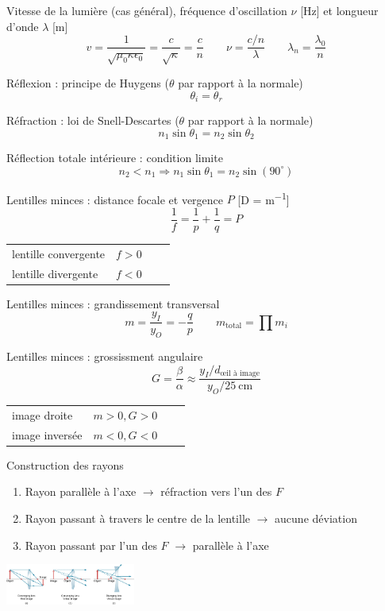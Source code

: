 \documentclass[10pt,landscape]{article}
\newcommand{\halfline}{\vspace{0.5em}}
\newcommand{\tableindent}{\hspace{1.5em}}
\begin{document}
\begin{multicols}{3}
Vitesse de la lumière (cas général), fréquence d'oscillation $\nu$ [Hz] et  longueur d'onde $\lambda$ [m]
\[ v = \frac{1}{\sqrt{\mu_0 \kappa \epsilon_0}} = \frac{c}{\sqrt{\kappa}} = \frac{c}{n}  
\qquad
\nu = \frac{c/n}{\lambda}
\qquad
\lambda_n = \frac{\lambda_0}{n}
\]

Réflexion : principe de Huygens {($\theta$ par rapport à la normale)}
\[ \theta_i = \theta_r\]

Réfraction : loi de Snell-Descartes {($\theta$ par rapport à la normale)}
\[ n_1\sin\theta_1 = n_2 \sin\theta_2 \]

Réflection totale intérieure : condition limite
\[ n_2 < n_1 \Rightarrow n_1 \sin\theta_1 = n_2 \sin(90^\circ) \]


Lentilles minces : distance focale et vergence $P$ [D = \si{\metre^{-1}}]
\[ \frac{1}{ f} = \frac{1}{p} + \frac{1}{q} = P \]

\begin{tabular}{@{\tableindent}llll}
	lentille convergente & $f>0$ \\
	lentille divergente & $f<0$ \\
\end{tabular}
\halfline

Lentilles minces : grandissement transversal
\[ m = \frac{y_I}{y_O} = -\frac{q}{p} 
\qquad m_\text{total} = \prod m_i
\]

Lentilles minces : grossissment angulaire
\[ G = \frac{\beta}{\alpha}
\approx \frac{y_I/d_\text{œil à image}}{y_O/\SI{25}{\centi\metre}} 
\]
\begin{tabular}{@{\tableindent}llll}
	image droite & $m>0, G>0$ \\
	image inversée & $m<0, G<0$ \\
\end{tabular}
\halfline

Construction des rayons
\begin{enumerate}
	\item Rayon parallèle à l'axe $\rightarrow$ réfraction vers l'un des $F$
	\item Rayon passant à travers le centre de la lentille $\rightarrow$ aucune déviation
	\item Rayon passant par l'un des $F$ $\rightarrow$ parallèle à l'axe
\end{enumerate}

\begin{center}
	\includegraphics[width=0.32\textwidth]{./phy1522/lentilles.jpeg}
\end{center}


\end{multicols}
\end{document}
